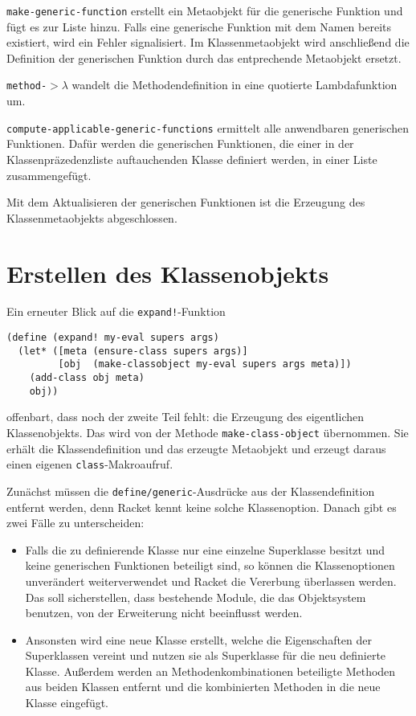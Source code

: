 \texttt{make-generic-function} erstellt ein Metaobjekt für die generische Funktion und fügt es zur Liste hinzu. Falls eine generische Funktion mit dem Namen bereits existiert, wird ein Fehler signalisiert. Im Klassenmetaobjekt wird anschließend die Definition der generischen Funktion durch das entprechende Metaobjekt ersetzt.

\texttt{method-$>\lambda$} wandelt die Methodendefinition in eine quotierte Lambdafunktion um.

\texttt{compute-applicable-generic-functions} ermittelt alle anwendbaren generischen Funktionen. Dafür werden die generischen Funktionen, die einer in der Klassenpräzedenzliste auftauchenden Klasse definiert werden, in einer Liste zusammengefügt.

Mit dem Aktualisieren der generischen Funktionen ist die Erzeugung des Klassenmetaobjekts abgeschlossen.

\section{Erstellen des Klassenobjekts}

Ein erneuter Blick auf die \texttt{expand!}-Funktion

\begin{lstlisting}
(define (expand! my-eval supers args)
  (let* ([meta (ensure-class supers args)]
         [obj  (make-classobject my-eval supers args meta)])
    (add-class obj meta)
    obj))
\end{lstlisting}

offenbart, dass noch der zweite Teil fehlt: die Erzeugung des eigentlichen Klassenobjekts. Das wird von der Methode \texttt{make-class-object} übernommen. Sie erhält die Klassendefinition und das erzeugte Metaobjekt und erzeugt daraus einen eigenen \texttt{class}-Makroaufruf.

Zunächst müssen die \texttt{define/generic}-Ausdrücke aus der Klassendefinition entfernt werden, denn Racket kennt keine solche Klassenoption. Danach gibt es zwei Fälle zu unterscheiden:
\begin{itemize}
 \item Falls die zu definierende Klasse nur eine einzelne Superklasse besitzt und keine generischen Funktionen beteiligt sind, so können die Klassenoptionen unverändert weiterverwendet und Racket die Vererbung überlassen werden. Das soll sicherstellen, dass bestehende Module, die das Objektsystem benutzen, von der Erweiterung nicht beeinflusst werden.
 \item Ansonsten wird eine neue Klasse erstellt, welche die Eigenschaften der Superklassen vereint und nutzen sie als Superklasse für die neu definierte Klasse. Außerdem werden an  Methodenkombinationen beteiligte Methoden aus beiden Klassen entfernt und die kombinierten Methoden in die neue Klasse eingefügt.
\end{itemize}

